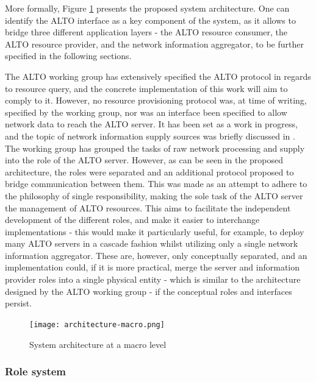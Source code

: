     More formally, Figure \ref{fig:macro-architecture} presents the proposed system architecture.
    One can identify the ALTO interface as a key component of the system, as it allows to bridge three different application layers - the ALTO resource consumer, the ALTO resource provider, and the network information aggregator, to be further specified in the following sections.

    The ALTO working group has extensively specified the ALTO protocol in regards to resource query, and the concrete implementation of this work will aim to comply to it.
    However, no resource provisioning protocol was, at time of writing, specified by the working group, nor was an interface been specified to allow network data to reach the ALTO server.
    It has been set as a work in progress, and the topic of network information supply sources was briefly discussed in \cite{alto-deployment-considerations}.
    The working group has grouped the tasks of raw network processing and supply into the role of the ALTO server.
    However, as can be seen in the proposed architecture, the roles were separated and an additional protocol proposed to bridge communication between them.
    This was made as an attempt to adhere to the philosophy of single responsibility, making the sole task of the ALTO server the management of ALTO resources.
    This aims to facilitate the independent development of the different roles, and make it easier to interchange implementations - this would make it particularly useful, for example, to deploy many ALTO servers in a cascade fashion whilst utilizing only a single network information aggregator.
    These are, however, only conceptually separated, and an implementation could, if it is more practical, merge the server and information provider roles into a single physical entity - which is similar to the architecture designed by the ALTO working group - if the conceptual roles and interfaces persist.

\begin{figure}[!h]
        \centering
        \texttt{[image: architecture-macro.png]}
        \caption{System architecture at a macro level}
        \label{fig:macro-architecture}
\end{figure}

\subsubsection{Role system}
\label{sssec:system-roles}

